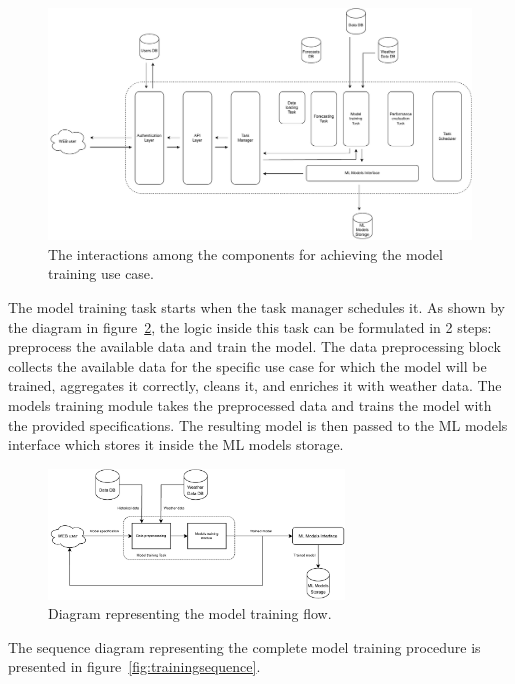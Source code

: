 \begin{figure}[H]
\centering
\includegraphics[width=1\textwidth]{images/architecture_training_interactions}
\caption{The interactions among the components for achieving the model training use case.}
\label{fig:traininginteractions}
\end{figure}

The model training task starts when the task manager schedules it.
As shown by the diagram in figure~\ref{fig:trainingflow}, the logic inside this task can be formulated in 2 steps: preprocess the available data and train the model.
The data preprocessing block collects the available data for the specific use case for which the model will be trained, aggregates it correctly, cleans it, and enriches it with weather data.
The models training module takes the preprocessed data and trains the model with the provided specifications.
The resulting model is then passed to the ML models interface which stores it inside the ML models storage.

\begin{figure}[H]
\centering
\includegraphics[width=0.7\textwidth]{images/architecture_training_flow}
\caption{Diagram representing the model training flow.}
\label{fig:trainingflow}
\end{figure}

The sequence diagram representing the complete model training procedure is presented in figure~\ref{fig:trainingsequence}.

